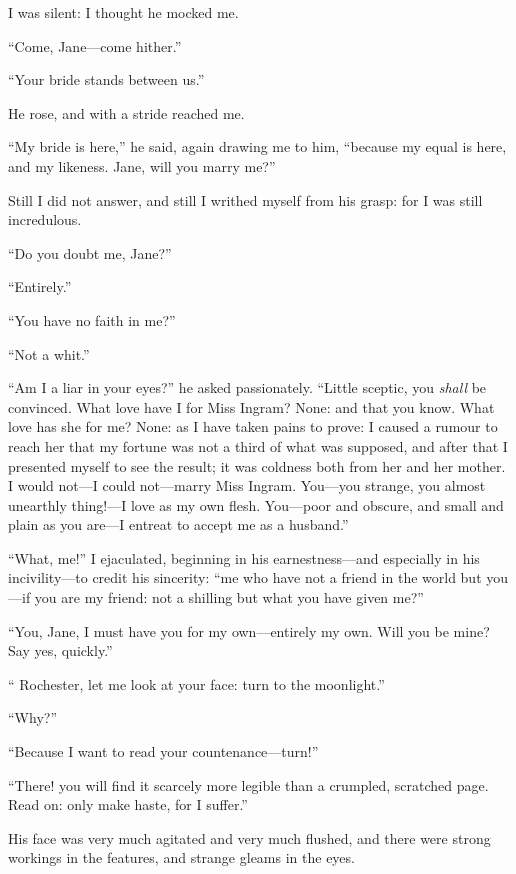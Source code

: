 I was silent: I thought he mocked me.

\enquote{Come, Jane---come hither.}

\enquote{Your bride stands between us.}

He rose, and with a stride reached me.

\enquote{My bride is here,} he said, again drawing me to him,
\enquote{because my equal is here, and my likeness. Jane, will you
	marry me?}

Still I did not answer, and still I writhed myself from his grasp: for I
was still incredulous.

\enquote{Do you doubt me, Jane?}

\enquote{Entirely.}

\enquote{You have no faith in me?}

\enquote{Not a whit.}

\enquote{Am I a liar in your eyes?} he asked passionately. \enquote{Little
	sceptic, you \emph{shall} be convinced. What love have I for Miss
	Ingram? None: and that you know. What love has she for me? None: as I
	have taken pains to prove: I caused a rumour to reach her that my
	fortune was not a third of what was supposed, and after that I presented
	myself to see the result; it was coldness both from her and her mother.
	I would not---I could not---marry Miss Ingram. You---you strange, you
	almost unearthly thing!---I love as my own flesh. You---poor and
	obscure, and small and plain as you are---I entreat to accept me as a
	husband.}

\enquote{What, me!} I ejaculated, beginning in his earnestness---and
especially in his incivility---to credit his sincerity: \enquote{me who
	have not a friend in the world but you---if you are my friend: not a
	shilling but what you have given me?}

\enquote{You, Jane, I must have you for my own---entirely my own. Will
	you be mine? Say yes, quickly.}

\enquote{\Mr{} Rochester, let me look at your face: turn to the
	moonlight.}

\enquote{Why?}

\enquote{Because I want to read your countenance---turn!}

\enquote{There! you will find it scarcely more legible than a crumpled,
	scratched page. Read on: only make haste, for I suffer.}

His face was very much agitated and very much flushed, and there were
strong workings in the features, and strange gleams in the eyes.

